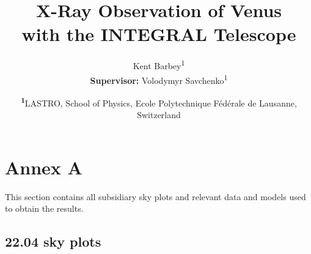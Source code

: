 \documentclass[
	a4paper, %
	10pt, %
	unnumberedsections, %
	twoside, %
]{LTJournalArticle}
\title{X-Ray Observation of Venus\\ with the INTEGRAL Telescope} %
\author{%
	Kent Barbey\textsuperscript{1} \\ \textbf{Supervisor:} Volodymyr Savchenko\textsuperscript{1}
}
\date{\footnotesize\textsuperscript{\textbf{1}}LASTRO, School of Physics, Ecole Polytechnique Fédérale de Lausanne, Switzerland}
\begin{document}
\maketitle %
\tableofcontents















\section{Annex A}
This section contains all subsidiary sky plots and relevant data and models used to obtain the results.

\subsection{22.04 sky plots}
\end{document}
